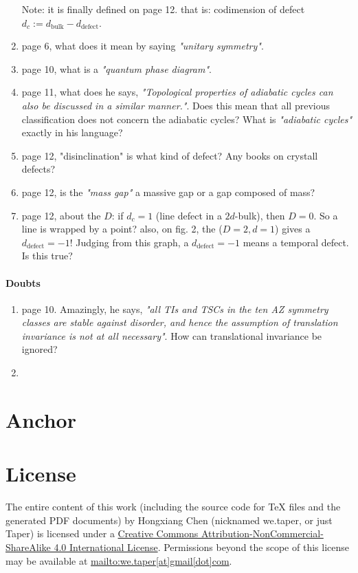 \documentclass{article}
\begin{document}
\begin{enumerate}
        Note: it is finally defined on page 12. that is:
        codimension of defect $d_c:= d_\text{bulk} - d_\text{defect}$.
    \item page 6, what does it mean by saying \textit{"unitary
        symmetry"}.
    \item page 10, what is a \textit{"quantum phase diagram"}.
    \item page 11, what does he says, \textit{"Topological properties of
        adiabatic cycles can also be discussed in a similar manner."}.
        Does this mean that all previous classification does not
        concern the adiabatic cycles? What is \textit{"adiabatic
        cycles"} exactly in his language?
    \item page 12, "disinclination" is what kind of defect? Any books
        on crystall defects?
    \item page 12, is the \textit{"mass gap"} a massive gap or a gap
        composed of mass?
    \item page 12, about the $D$: if $d_c=1$ (line defect in a
        $2d$-bulk), then $D=0$. So a line is wrapped by a point?
        also, on fig. 2, the ($D=2,d=1$) gives a $d_\text{defect}=-1$!
        Judging from this graph, a $d_\text{defect}=-1$ means a
        temporal defect. Is this true?
\end{enumerate}

\paragraph{Doubts}
\begin{enumerate}
    \item page 10. Amazingly, he says, \textit{"all TIs and TSCs in
        the ten AZ symmetry classes are stable against disorder, and
        hence the assumption of translation invariance is not at all
        necessary"}.  How can translational invariance be ignored?
    \item 
\end{enumerate}
\section{Anchor}
\label{sec:Anchor}

\begin{thebibliography}{1}
\end{thebibliography}
\printnomenclature
\section{License}
The entire content of this work (including the source code
for TeX files and the generated PDF documents) by 
Hongxiang Chen (nicknamed we.taper, or just Taper) is
licensed under a 
\href{http://creativecommons.org/licenses/by-nc-sa/4.0/}{Creative 
Commons Attribution-NonCommercial-ShareAlike 4.0 International 
License}. Permissions beyond the scope of this 
license may be available at \url{mailto:we.taper[at]gmail[dot]com}.
\end{document}
